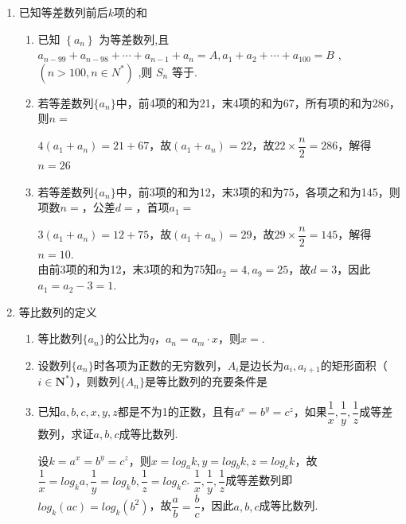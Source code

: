 \begin{enumerate}
\begin{enumerate}
\begin{jieda}
        \end{jieda}
    \end{enumerate}
    \item 已知等差数列前后$k$项的和
    \begin{enumerate}
        \item 已知 $\left\{  {a}_{n}\right\}$ 为等差数列,且 ${a}_{n - {99}} + {a}_{n - {98}} + \cdots  + {a}_{n - 1} + {a}_{n} = A,{a}_{1} + {a}_{2} + \cdots  + {a}_{100} = B$ , $\left( {n > {100},n \in  {N}^{ * }}\right)$ ,则 ${S}_{n}$ 等于.
        \item 若等差数列$\{a_n\}$中，前4项的和为21，末4项的和为67，所有项的和为286，则$n = $
        \begin{jieda}
            $4(a_1 + a_n) = 21 + 67$，故$(a_1 + a_n) = 22$，故$22 \times \dfrac{n}{2} = 286$，解得$n = 26$
        \end{jieda}
        \item 若等差数列$\{a_n\}$中，前3项的和为12，末3项的和为75，各项之和为145，则项数$n = $，公差$d = $，首项$a_1 = $
        \begin{jieda}
            $3(a_1 + a_n) = 12 + 75$，故$(a_1 + a_n) = 29$，故$29 \times \dfrac{n}{2} = 145$，解得$n = 10$. \\
            由前3项的和为12，末3项的和为75知$a_2 = 4, a_9 = 25$，故$d = 3$，因此$a_1 = a_2 - 3 = 1$.
        \end{jieda}
    \end{enumerate}
    \item 等比数列的定义
    \begin{enumerate}
        \item 等比数列$\{a_n\}$的公比为$q$，$a_n = a_m \cdot x$，则$x = $.
        \item 设数列$\{a_n\}$时各项为正数的无穷数列，$A_i$是边长为$a_i, a_{i+1}$的矩形面积（$i \in \mathbf{N^*}$），则数列$\{A_n\}$是等比数列的充要条件是
        \item 已知$a, b, c, x, y, z$都是不为1的正数，且有$a^x = b^y = c^z$，如果$\dfrac{1}{x}, \dfrac{1}{y}, \dfrac{1}{z}$成等差数列，求证$a, b, c$成等比数列.
        \begin{jieda}
            设$k = a^x = b^y = c^z$，则$x = log_ak, y = log_bk, z = log_ck$，故$\dfrac{1}{x} = log_ka, \dfrac{1}{y} = log_kb, \dfrac{1}{z} = log_kc$. $\dfrac{1}{x}, \dfrac{1}{y}, \dfrac{1}{z}$成等差数列即$log_k(ac) = log_k(b^2)$，故$\dfrac{a}{b} = \dfrac{b}{c}$，因此$a, b, c$成等比数列.

\end{jieda}
\end{enumerate}
\end{enumerate}
